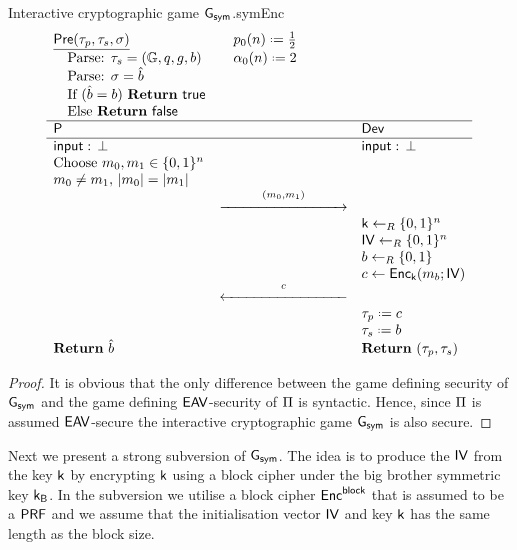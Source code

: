 \begin{intGame}{Interactive cryptographic game $\operatorname{\mathsf{G}}_{\mathsf{sym}}$.}{symEnc}
\begin{align*}
\begin{array}{lll}
\underline{\pred(\ptrans,\strans,\sigma)} & \quad\basep(n) \defeq \frac{1}{2} & \\
\quad\mbox{Parse: } \strans = (\cgroup,\order,\generator,b) & \quad\secf(n) \defeq 2 & \\
\quad\mbox{Parse: } \sigma = \hat{b} \\
\quad\mbox{If  } (\hat{b} = b) \mbox{ \Ret } \true \\ 
\quad\mbox{Else \Ret } \false \\
\hline \party &  & \dev \\ 
\hline \I: \, \bot &  & \I:\,\bot \\ 
\mbox{Choose } m_0,m_1\in\{0,1\}^n & & \\
m_0 \neq m_1,\,\vert m_0\vert = \vert m_1\vert & & \\
 & \longrightar{(m_0,m_1)}{3} & \\
 & & \key\unileft\{0,1\}^n \\
 & & \iv\unileft\{0,1\}^n \\
 & & b\unileft\{0,1\} \\
 & & c \leftarrow \enc_{\key}(m_b;\iv) \\
 & \longleftar{c}{3} & \\
 & & \ptrans \defeq c \\
 & & \strans \defeq b \\
\Ret \hat{b} & & \Ret (\ptrans,\strans) \\
\end{array}   
\end{align*}
\end{intGame}

\begin{proof}
It is obvious that the only difference between the game defining security of $\operatorname{\mathsf{G}}_{\mathsf{sym}}$ and the game defining $\mathsf{EAV}$-security of $\operatorname{\Pi}$ is syntactic. Hence, since $\operatorname{\Pi}$ is assumed $\mathsf{EAV}$-secure the interactive cryptographic game $\operatorname{\mathsf{G}}_{\mathsf{sym}}$ is also secure. 
\end{proof}

Next we present a strong subversion of $\operatorname{\mathsf{G}}_{\mathsf{sym}}$. The idea is to produce the $\mathsf{IV}$ from the key $\mathsf{k}$ by encrypting $\mathsf{k}$ using a block cipher under the big brother symmetric key $\mathsf{k}_{\mathsf{B}}$. In the subversion we utilise a block cipher $\operatorname{\mathsf{Enc}^{\mathsf{block}}}$ that is assumed to be a $\mathsf{PRF}$ and we assume that the initialisation vector $\mathsf{IV}$ and key $\mathsf{k}$ has the same length as the block size. 

